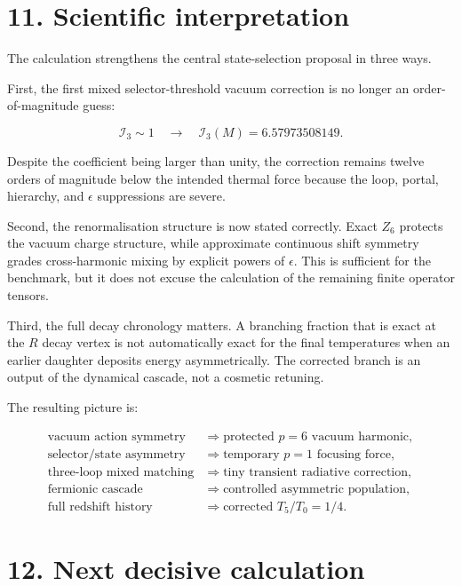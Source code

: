 \documentclass[
  10pt,
]{article}
\begin{document}
\section{11. Scientific interpretation}\label{scientific-interpretation}

The calculation strengthens the central state-selection proposal in
three ways.

First, the first mixed selector-threshold vacuum correction is no longer
an order-of-magnitude guess:

\[
\mathcal I_3\sim1
\quad\longrightarrow\quad
\mathcal I_3(M)=6.57973508149.
\]

Despite the coefficient being larger than unity, the correction remains
twelve orders of magnitude below the intended thermal force because the
loop, portal, hierarchy, and \(\epsilon\) suppressions are severe.

Second, the renormalisation structure is now stated correctly. Exact
\(Z_6\) protects the vacuum charge structure, while approximate
continuous shift symmetry grades cross-harmonic mixing by explicit
powers of \(\epsilon\). This is sufficient for the benchmark, but it
does not excuse the calculation of the remaining finite operator
tensors.

Third, the full decay chronology matters. A branching fraction that is
exact at the \(R\) decay vertex is not automatically exact for the final
temperatures when an earlier daughter deposits energy asymmetrically.
The corrected branch is an output of the dynamical cascade, not a
cosmetic retuning.

The resulting picture is:

\[
\boxed{
\begin{aligned}
\text{vacuum action symmetry}
&\Rightarrow
\text{protected }p=6\text{ vacuum harmonic},\\
\text{selector/state asymmetry}
&\Rightarrow
\text{temporary }p=1\text{ focusing force},\\
\text{three-loop mixed matching}
&\Rightarrow
\text{tiny transient radiative correction},\\
\text{fermionic cascade}
&\Rightarrow
\text{controlled asymmetric population},\\
\text{full redshift history}
&\Rightarrow
\text{corrected }T_5/T_0=1/4.
\end{aligned}
}
\]

\section{12. Next decisive calculation}\label{next-decisive-calculation}
\end{document}
